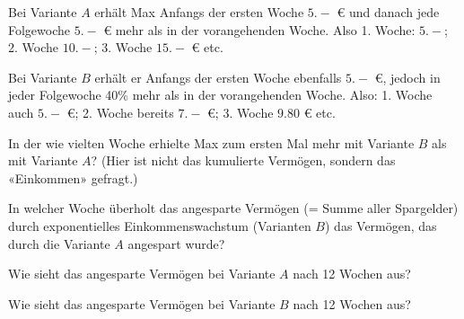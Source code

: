 Bei Variante $A$ erhält Max Anfangs der ersten Woche  $5.-$ \euro{} und danach jede Folgewoche $5.-$ \euro{} mehr als in der vorangehenden Woche. Also 1. Woche: $5.-$; 2. Woche $10.-$; 3. Woche $15.-$ \euro{} etc.

Bei Variante $B$ erhält er Anfangs der ersten Woche ebenfalls $5.-$
\euro{}, jedoch in jeder Folgewoche 40\% mehr als in der vorangehenden
Woche. Also: 1. Woche auch $5.-$ \euro{}; 2. Woche bereits $7.-$ \euro{}; 3. Woche $9.80$ \euro{} etc.

\begin{bbwAufgabenBlock}
\item In der wie vielten  Woche erhielte Max zum ersten Mal mehr mit Variante $B$ als mit Variante $A$? (Hier ist nicht das kumulierte Vermögen, sondern das «Einkommen» gefragt.)

\item In welcher Woche überholt das angesparte Vermögen (= Summe aller
  Spargelder) durch exponentielles Einkommenswachstum (Varianten $B$) das Vermögen, das durch die Variante $A$ angespart wurde?

\item Wie sieht das angesparte Vermögen bei Variante $A$ nach 12 Wochen aus?

\item Wie sieht das angesparte Vermögen bei Variante $B$ nach 12 Wochen aus?
\end{bbwAufgabenBlock}
\platzFuerBerechnungenBisEndeSeite{}



\newpage
